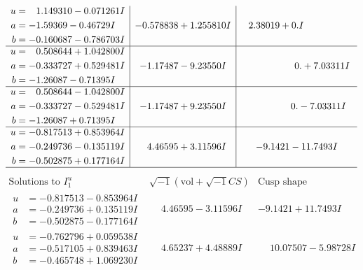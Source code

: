 \documentclass[1p]{elsarticle_modified}
\theoremstyle{definition}
\newcommand{\I}{\sqrt{-1}}
\begin{document}
$$\begin{array}{c|c|c}
\begin{aligned}
u &= \phantom{-}1.149310 - 0.071261 I \\
a &= -1.59369 - 0.46729 I \\
b &= -0.160687 - 0.786703 I\end{aligned}
 & -0.578838 + 1.255810 I & \phantom{-}2.38019 + 0. I\phantom{ +0.000000I} \\ \hline\begin{aligned}
u &= \phantom{-}0.508644 + 1.042800 I \\
a &= -0.333727 + 0.529481 I \\
b &= -1.26087 - 0.71395 I\end{aligned}
 & -1.17487 - 9.23550 I & \phantom{-0.000000 -}0. + 7.03311 I \\ \hline\begin{aligned}
u &= \phantom{-}0.508644 - 1.042800 I \\
a &= -0.333727 - 0.529481 I \\
b &= -1.26087 + 0.71395 I\end{aligned}
 & -1.17487 + 9.23550 I & \phantom{-0.000000 } 0. - 7.03311 I \\ \hline\begin{aligned}
u &= -0.817513 + 0.853964 I \\
a &= -0.249736 - 0.135119 I \\
b &= -0.502875 + 0.177164 I\end{aligned}
 & \phantom{-}4.46595 + 3.11596 I & -9.1421 - 11.7493 I\\
 \hline 
 \end{array}$$\newpage$$\begin{array}{c|c|c}  
\text{Solutions to }I^u_{1}& \I (\text{vol} + \sqrt{-1}CS) & \text{Cusp shape}\\
 \hline 
\begin{aligned}
u &= -0.817513 - 0.853964 I \\
a &= -0.249736 + 0.135119 I \\
b &= -0.502875 - 0.177164 I\end{aligned}
 & \phantom{-}4.46595 - 3.11596 I & -9.1421 + 11.7493 I \\ \hline\begin{aligned}
u &= -0.762796 + 0.059538 I \\
a &= -0.517105 + 0.839463 I \\
b &= -0.465748 + 1.069230 I\end{aligned}
 & \phantom{-}4.65237 + 4.48889 I & \phantom{-}10.07507 - 5.98728 I \\ \hline\begin{aligned}

\end{aligned}
\end{array}$$
\end{document}
